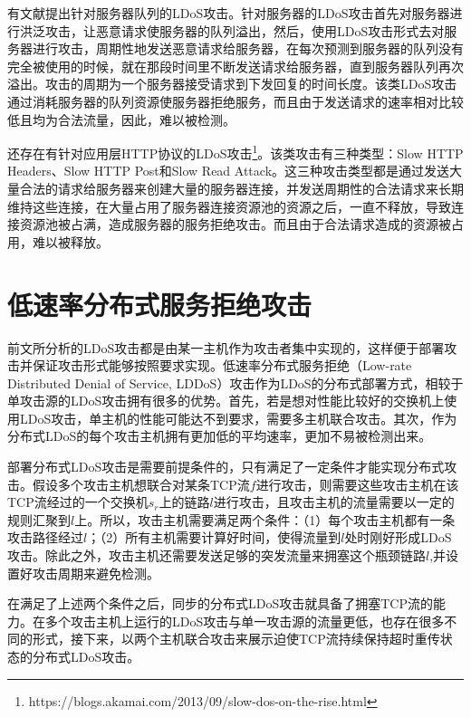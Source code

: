 有文献\cite{Maci2007Evaluation}提出针对服务器队列的LDoS攻击。针对服务器的LDoS攻击首先对服务器进行洪泛攻击，让恶意请求使服务器的队列溢出，然后，使用LDoS攻击形式去对服务器进行攻击，周期性地发送恶意请求给服务器，在每次预测到服务器的队列没有完全被使用的时候，就在那段时间里不断发送请求给服务器，直到服务器队列再次溢出。攻击的周期为一个服务器接受请求到下发回复的时间长度。该类LDoS攻击通过消耗服务器的队列资源使服务器拒绝服务，而且由于发送请求的速率相对比较低且均为合法流量，因此，难以被检测。

还存在有针对应用层HTTP协议的LDoS攻击\footnote{https://blogs.akamai.com/2013/09/slow-dos-on-the-rise.html}。该类攻击有三种类型：Slow HTTP Headers、Slow HTTP Post和Slow Read Attack。这三种攻击类型都是通过发送大量合法的请求给服务器来创建大量的服务器连接，并发送周期性的合法请求来长期维持这些连接，在大量占用了服务器连接资源池的资源之后，一直不释放，导致连接资源池被占满，造成服务器的服务拒绝攻击。而且由于合法请求造成的资源被占用，难以被释放。
\section{低速率分布式服务拒绝攻击}


前文所分析的LDoS攻击都是由某一主机作为攻击者集中实现的，这样便于部署攻击并保证攻击形式能够按照要求实现。低速率分布式服务拒绝（Low-rate Distributed Denial of Service, LDDoS）攻击作为LDoS的分布式部署方式，相较于单攻击源的LDoS攻击拥有很多的优势。首先，若是想对性能比较好的交换机上使用LDoS攻击，单主机的性能可能达不到要求，需要多主机联合攻击。其次，作为分布式LDoS的每个攻击主机拥有更加低的平均速率，更加不易被检测出来。

部署分布式LDoS攻击是需要前提条件的，只有满足了一定条件才能实现分布式攻击。假设多个攻击主机想联合对某条TCP流$f$进行攻击，则需要这些攻击主机在该TCP流经过的一个交换机$s_r$上的链路$l$进行攻击，且攻击主机的流量需要以一定的规则汇聚到$l$上。所以，攻击主机需要满足两个条件：（1）每个攻击主机都有一条攻击路径经过$l$；（2）所有主机需要计算好时间，使得流量到$l$处时刚好形成LDoS攻击。除此之外，攻击主机还需要发送足够的突发流量来拥塞这个瓶颈链路$l$,并设置好攻击周期来避免检测。

在满足了上述两个条件之后，同步的分布式LDoS攻击就具备了拥塞TCP流的能力。在多个攻击主机上运行的LDoS攻击与单一攻击源的流量更低，也存在很多不同的形式，接下来，以两个主机联合攻击来展示迫使TCP流持续保持超时重传状态的分布式LDoS攻击。


